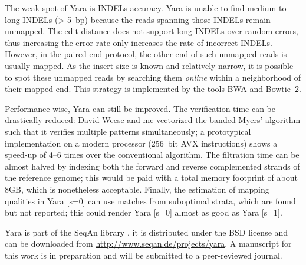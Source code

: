 The weak spot of Yara is INDELs accuracy.
Yara is unable to find medium to long INDELs (\ie > 5~bp) because the reads spanning those INDELs remain unmapped.
The edit distance does not support long INDELs over random errors, thus increasing the error rate only increases the rate of incorrect INDELs.
However, in the paired-end protocol, the other end of such unmapped reads is usually mapped.
As the insert size is known and relatively narrow, it is possible to spot these unmapped reads by searching them \emph{online} within a neighborhood of their mapped end.
This strategy is implemented by the tools BWA and Bowtie~2.

Performance-wise, Yara can still be improved.
The verification time can be drastically reduced: David Weese and me vectorized the banded Myers' algorithm such that it verifies multiple patterns simultaneously; a prototypical implementation on a modern processor (256~bit AVX instructions) shows a speed-up of 4--6 times over the conventional algorithm.
The filtration time can be almost halved by indexing both the forward and reverse complemented strands of the reference genome; this would be paid with a total memory footprint of about 8GB, which is nonetheless acceptable.
Finally, the estimation of mapping qualities in Yara [s=0] can use matches from suboptimal strata, which are found but not reported; this could render Yara [s=0] almost as good as Yara [s=1].

Yara is part of the SeqAn library \citep{Doering2008}, it is distributed under the BSD license and can be downloaded from \url{http://www.seqan.de/projects/yara}.
A manuscript for this work is in preparation and will be submitted to a peer-reviewed journal.
